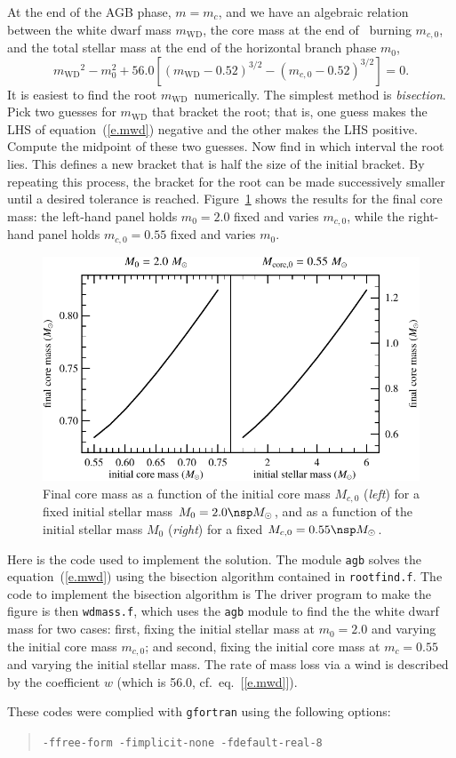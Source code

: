 \documentclass[11pt]{article}
\newcommand{\mwd}{\ensuremath{m_{\mathrm{WD}}}}
\begin{document}
At the end of the AGB phase, $m = m_{c}$, and we have an algebraic relation between the white dwarf mass $\mwd$, the core mass at the end of \helium\ burning $m_{c,0}$, and the total stellar mass at the end of the horizontal branch phase $m_{0}$,
\begin{equation}\label{e.mwd}
\mwd^{2} - m_{0}^{2} + 56.0\left[\left(\mwd-0.52\right)^{3/2} - \left(m_{c,0}-0.52\right)^{3/2}\right] = 0.
\end{equation}
It is easiest to find the root \mwd\ numerically. The simplest method is \emph{bisection}.  Pick two guesses for $\mwd$ that bracket the root; that is, one guess makes the LHS of equation~(\ref{e.mwd}) negative and the other makes the LHS positive.  Compute the midpoint of these two guesses.  Now find in which interval the root lies.  This defines a new bracket that is half the size of the initial bracket. By repeating this process, the bracket for the root can be made successively smaller until a desired tolerance is reached.  Figure~\ref{f.core-mass} shows the results for the final core mass: the left-hand panel holds $m_{0} = 2.0$ fixed and varies $m_{c,0}$, while the right-hand panel holds $m_{c,0} = 0.55$ fixed and varies $m_{0}$.

\begin{figure}[htbp]
\includegraphics[width=5in]{plots_out/core_mass_combined}
\caption{Final core mass as a function of the initial core mass $M_{c,0}$ (\emph{left}) for  a fixed initial stellar mass $M_{0} = 2.0\nsp\Msun$, and as a function of the initial stellar mass $M_{0}$ (\emph{right}) for a fixed $M_{c,0}=0.55\nsp\Msun$.\label{f.core-mass}}
\end{figure}
\clearpage

Here is the code used to implement the solution.  The module \verb|agb| solves the equation~(\ref{e.mwd}) using the bisection algorithm contained in \verb|rootfind.f|.
The code to implement the bisection algorithm is
The driver program to make the figure is then \verb|wdmass.f|, which uses the \verb|agb| module to find the the white dwarf mass for two cases: first, fixing the initial stellar mass at $m_{0} = 2.0$ and varying the initial core mass $m_{c,0}$; and second, fixing the initial core mass at $m_{c} = 0.55$ and varying the initial stellar mass.  The rate of mass loss via a wind is described by the coefficient $w$ (which is 56.0, cf.\ eq.~[\ref{e.mwd}]).

These codes were complied with \verb|gfortran| using the following options:
\begin{quote}
\verb|-ffree-form -fimplicit-none -fdefault-real-8|
\end{quote}
\end{document}
